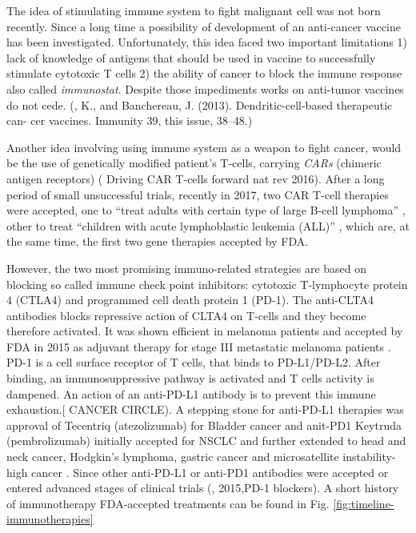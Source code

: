 \documentclass[12pt,]{book}
\theoremstyle{definition}
\theoremstyle{definition}
\theoremstyle{definition}
\theoremstyle{remark}
\begin{document}
The idea of stimulating immune system to fight malignant cell was not
born recently. Since a long time a possibility of development of an
anti-cancer vaccine has been investigated. Unfortunately, this idea
faced two important limitations 1) lack of knowledge of antigens that
should be used in vaccine to successfully stimulate cytotoxic T cells 2)
the ability of cancer to block the immune response also called
\emph{immunostat}. Despite those impediments works on anti-tumor
vaccines do not cede. (\citet{Palucka}, K., and Banchereau, J. (2013).
Dendritic-cell-based therapeutic can- cer vaccines. Immunity 39, this
issue, 38--48.)

Another idea involving using immune system as a weapon to fight cancer,
would be the use of genetically modified patient's T-cells, carrying
\emph{CARs} (chimeric antigen receptors) (\citet{Jackson} Driving CAR
T-cells forward nat rev 2016). After a long period of small unsuccessful
trials, recently in 2017, two CAR T-cell therapies were accepted, one to
``treat adults with certain type of large B-cell lymphoma''
\citep{FDACARTadult}, other to treat ``children with acute lymphoblastic
leukemia (ALL)'' \citep{FDACARTALL} , which are, at the same time, the
first two gene therapies accepted by FDA.

However, the two most promising immuno-related strategies are based on
blocking so called immune check point inhibitors: cytotoxic T-lymphocyte
protein 4 (CTLA4) and programmed cell death protein 1 (PD-1). The
anti-CLTA4 antibodies blocks repressive action of CLTA4 on T-cells and
they become therefore activated. It was shown efficient in melanoma
patients and accepted by FDA in 2015 as adjuvant therapy for stage III
metastatic melanoma patients \citep{FDACTLA4}. PD-1 is a cell surface
receptor of T cells, that binds to PD-L1/PD-L2. After binding, an
immunosuppressive pathway is activated and T cells activity is dampened.
An action of an anti-PD-L1 antibody is to prevent this immune
exhaustion.{[}\citet{IMMUNE} CANCER CIRCLE). A stepping stone for
anti-PD-L1 therapies was approval of Tecentriq (atezolizumab) for
Bladder cancer \citep{FDAPDL1Bladder} and anit-PD1 Keytruda
(pembrolizumab) initially accepted for NSCLC and further extended to
head and neck cancer, Hodgkin's lymphoma, gastric cancer and
microsatellite instability-high cancer \citep{FDAPDL1NSCLC}. Since other
anti-PD-L1 or anti-PD1 antibodies were accepted or entered advanced
stages of clinical trials (\citet{Wolchok}, 2015,PD-1 blockers). A short
history of immunotherapy FDA-accepted treatments can be found in Fig.
\ref{fig:timeline-immunotherapies}
\end{document}
